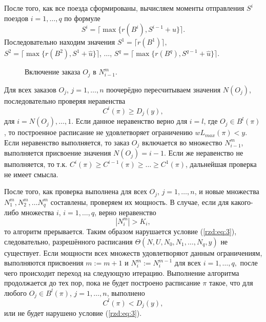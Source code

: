 После того, как все поезда сформированы, вычисляем моменты отправления $S^i$ поездов $i=1, \dots, q$ по формуле
$$S^i = \lceil \max \{r(B^i), S^{i-1} + \widehat{u}\} \rceil.$$
Последовательно находим значения
$S^1 = \lceil r(B^1) \rceil,$ $S^2 = \lceil \max\{r(B^2), S^1 + \widehat{u}\} \rceil$, $\dots$, $S^q = \lceil \max\{r(B^q), S^{q-1} + \widehat{u}\} \rceil$.

\begin{figure}[h!]
\caption{Включение заказа $O_j$ в $N^m_{i-1}$.}
\label{rzd:pic:4}
\end{figure}

Для всех заказов $O_j$, $j=1, \dots, n$ поочерёдно пересчитываем значения $N(O_j)$, последовательно проверяя неравенства
$$C^i(\pi) \geq D_j(y),$$
для $i=N(O_j), \dots, 1$. Если данное неравенство верно для $i=l$, где $O_j \in B^l(\pi)$, то построенное расписание не удовлетворяет ограничению $wL_{max} (\pi) < y.$
Если неравенство выполняется, то заказ $O_j$ включается во множество $N^m_{i-1}$, выполняется присвоение значения $N(O_j) = i-1.$ Если же неравенство не выполняется, то т.к. $C^i(\pi) \geq C^{i-1}(\pi) \geq \dots \geq C^1(\pi)$, дальнейшая проверка не имеет смысла.

После того, как проверка выполнена для всех $O_j$, $j=1, \dots, n$, и новые множества $N^m_1, N^m_2, \dots N^m_q$ составлены, проверяем их мощность. В случае, если для какого-либо множества $i$, $i=1, \dots, q$, верно неравенство
$$|N^m_i| > K_i,$$
 то алгоритм прерывается. Таким образом нарушается условие (\ref{rzd:eq:3}), следовательно, разрешённого расписания $\Theta(N,U,N_0, N_1, \dots, N_q, y)$ не существует. Если мощности всех множеств удовлетворяют данным ограничениям, выполняются присвоения $m:=m+1$ и $N^m_i := N_i^{m-1}$ для всех $i=1, \dots, q,$ после чего происходит переход на следующую итерацию. Выполнение алгоритма продолжается до тех пор, пока не будет построено расписание $\pi$ такое, что для любого $O_j \in B^l(\pi)$, $j = 1,\dots, n$, выполнено
 $$C^l(\pi) < D_j(y),$$
или не будет нарушено условие (\ref{rzd:eq:3}).

